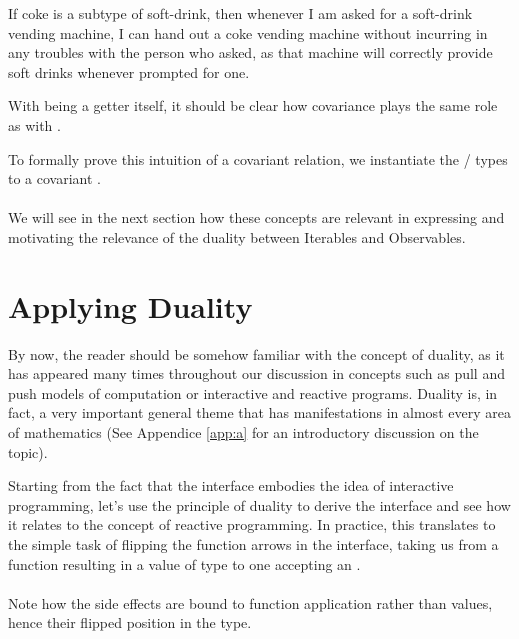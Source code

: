 If coke is a subtype of soft-drink, then whenever I am asked for a soft-drink vending machine, I can hand out a coke vending machine without incurring in any troubles with the person who asked, as that machine will correctly provide soft drinks whenever prompted for one.

With  being a getter itself, it should be clear how covariance plays the same role as with .

To formally prove this intuition of a covariant relation, we instantiate the / types to a covariant .\\

\\

We will see in the next section how these concepts are relevant in expressing and motivating the relevance of the duality between Iterables and Observables.

\section{Applying Duality}
\label{sec:applyingduality}

By now, the reader should be somehow familiar with the concept of duality, as it has appeared many times throughout our discussion in concepts such as pull and push models of computation or interactive and reactive programs. Duality is, in fact, a very important general theme that has manifestations in almost every area of mathematics\cite{gowers2010princeton} (See Appendice \ref{app:a} for an introductory discussion on the topic). 

Starting from the fact that the  interface embodies the idea of interactive programming, let's use the principle of duality to derive the  interface and see how it relates to the concept of reactive programming. In practice, this translates to the simple task of flipping the function arrows in the  interface, taking us from a function resulting in a value of type  to one accepting an .\\

\\

Note how the side effects are bound to function application rather than values, hence their flipped position in the  type.

